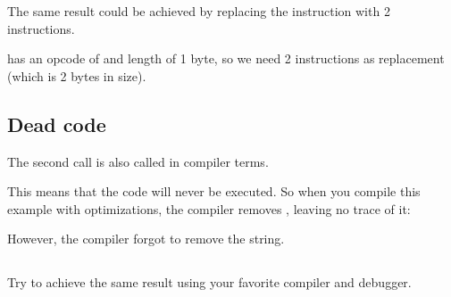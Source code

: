 

The same result could be achieved by replacing the \JMP instruction with 2 \NOP instructions.

\NOP has an opcode of  and length of 1 byte, so we need 2 instructions as \JMP replacement (which is 2 bytes in size).

\subsection{Dead code}

The second \printf call is also called  in compiler terms.

This means that the code will never be executed.
So when you compile this example with optimizations, the compiler removes , leaving
no trace of it:



However, the compiler forgot to remove the  string.


\subsection{\Exercise}


Try to achieve the same result using your favorite compiler and debugger.


